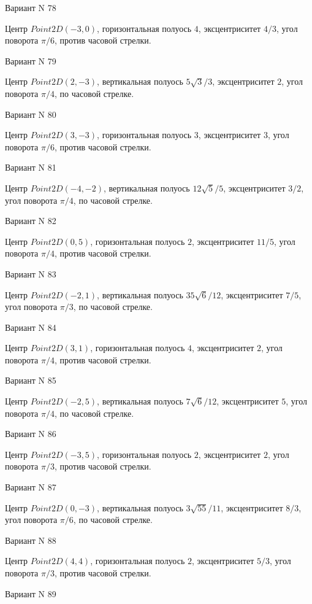 \documentclass[11pt]{report}
\begin{document}
Вариант N 78

Центр $Point2D\left(-3, 0\right)$, горизонтальная полуось $4$, эксцентриситет $4 / 3$, угол поворота $\pi / 6$, против часовой стрелки.

Вариант N 79

Центр $Point2D\left(2, -3\right)$, вертикальная полуось $5 \sqrt{3} / 3$, эксцентриситет $2$, угол поворота $\pi / 4$, по часовой стрелке.

Вариант N 80

Центр $Point2D\left(3, -3\right)$, горизонтальная полуось $3$, эксцентриситет $3$, угол поворота $\pi / 6$, против часовой стрелки.

Вариант N 81

Центр $Point2D\left(-4, -2\right)$, вертикальная полуось $12 \sqrt{5} / 5$, эксцентриситет $3 / 2$, угол поворота $\pi / 4$, по часовой стрелке.

Вариант N 82

Центр $Point2D\left(0, 5\right)$, горизонтальная полуось $2$, эксцентриситет $11 / 5$, угол поворота $\pi / 4$, против часовой стрелки.

Вариант N 83

Центр $Point2D\left(-2, 1\right)$, вертикальная полуось $35 \sqrt{6} / 12$, эксцентриситет $7 / 5$, угол поворота $\pi / 3$, по часовой стрелке.

Вариант N 84

Центр $Point2D\left(3, 1\right)$, горизонтальная полуось $4$, эксцентриситет $2$, угол поворота $\pi / 4$, против часовой стрелки.

Вариант N 85

Центр $Point2D\left(-2, 5\right)$, вертикальная полуось $7 \sqrt{6} / 12$, эксцентриситет $5$, угол поворота $\pi / 4$, по часовой стрелке.

Вариант N 86

Центр $Point2D\left(-3, 5\right)$, горизонтальная полуось $2$, эксцентриситет $2$, угол поворота $\pi / 3$, против часовой стрелки.

Вариант N 87

Центр $Point2D\left(0, -3\right)$, вертикальная полуось $3 \sqrt{55} / 11$, эксцентриситет $8 / 3$, угол поворота $\pi / 6$, по часовой стрелке.

Вариант N 88

Центр $Point2D\left(4, 4\right)$, горизонтальная полуось $2$, эксцентриситет $5 / 3$, угол поворота $\pi / 3$, против часовой стрелки.

Вариант N 89
\end{document}
